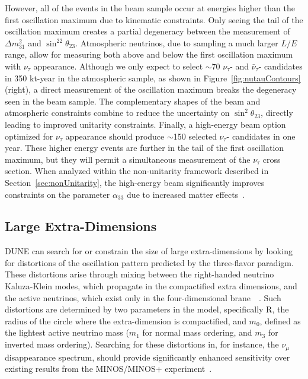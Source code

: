 However, all of the events in the beam sample occur at energies higher than the first oscillation maximum due to kinematic constraints.  Only seeing the tail of the oscillation maximum creates a partial degeneracy between the measurement of $\Delta m^2_{31}$ and $\sin^22\theta_{23}$.  Atmospheric neutrinos, due to sampling a much larger $L/E$ range, allow for measuring both above and below the first oscillation maximum with $\nu_{\tau}$ appearance. Although we only expect to select $\sim$70 $\nu_{\tau}$- and $\bar{\nu}_{\tau}$- candidates in 350 kt-year in the atmospheric sample, as shown in Figure~\ref{fig:nutauContours} (right), a direct measurement of the oscillation maximum breaks the degeneracy seen in the beam sample. The complementary shapes of the beam and atmospheric constraints combine to reduce the uncertainty on $\sin^2\theta_{23}$, directly leading to improved unitarity constraints.  Finally, a high-energy beam option optimized for $\nu_{\tau}$ appearance should produce $\sim$150 selected  $\nu_{\tau}$- candidates in one year.  These higher energy events are further in the tail of the first oscillation maximum, but they will permit a simultaneous measurement of the $\nu_{\tau}$ cross section. When analyzed within the non-unitarity framework described in Section~\ref{sec:nonUnitarity}, the high-energy beam significantly improves constraints on the parameter $\alpha_{33}$ due to increased matter effects~\cite{deGouvea:2019ozk}.

\subsection{Large Extra-Dimensions}
DUNE can search for or constrain the size of large extra-dimensions %
by looking for distortions of the oscillation pattern predicted by the three-flavor paradigm. These distortions arise through mixing between the right-handed neutrino Kaluza-Klein modes, which propagate in the compactified extra dimensions, and the active neutrinos, which exist only in the four-dimensional brane~~\cite{Dienes:1998sb,ArkaniHamed:1998vp,Davoudiasl:2002fq}. Such distortions are determined by two parameters in the model, specifically R, the radius of the circle where the extra-dimension is compactified, and $m_0$, defined as the lightest active neutrino mass ($m_1$ for normal mass ordering, and $m_3$ for inverted mass ordering). Searching for these distortions in, for instance, the $\nu_\mu$~ disappearance spectrum, should provide significantly enhanced sensitivity over existing results from the MINOS/MINOS+ experiment~\cite{Adamson:2016yvy}.

